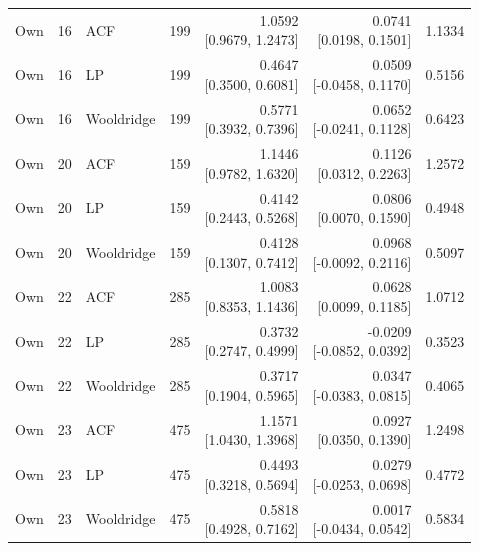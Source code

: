 \begin{longtable}{lllrrrr}
Own & 16 & ACF & 199 & \makecell{1.0592\\{[0.9679, 1.2473]}} & \makecell{0.0741\\{[0.0198, 0.1501]}} & 1.1334 \\
Own & 16 & LP & 199 & \makecell{0.4647\\{[0.3500, 0.6081]}} & \makecell{0.0509\\{[-0.0458, 0.1170]}} & 0.5156 \\
Own & 16 & Wooldridge & 199 & \makecell{0.5771\\{[0.3932, 0.7396]}} & \makecell{0.0652\\{[-0.0241, 0.1128]}} & 0.6423 \\
Own & 20 & ACF & 159 & \makecell{1.1446\\{[0.9782, 1.6320]}} & \makecell{0.1126\\{[0.0312, 0.2263]}} & 1.2572 \\
Own & 20 & LP & 159 & \makecell{0.4142\\{[0.2443, 0.5268]}} & \makecell{0.0806\\{[0.0070, 0.1590]}} & 0.4948 \\
Own & 20 & Wooldridge & 159 & \makecell{0.4128\\{[0.1307, 0.7412]}} & \makecell{0.0968\\{[-0.0092, 0.2116]}} & 0.5097 \\
Own & 22 & ACF & 285 & \makecell{1.0083\\{[0.8353, 1.1436]}} & \makecell{0.0628\\{[0.0099, 0.1185]}} & 1.0712 \\
Own & 22 & LP & 285 & \makecell{0.3732\\{[0.2747, 0.4999]}} & \makecell{-0.0209\\{[-0.0852, 0.0392]}} & 0.3523 \\
Own & 22 & Wooldridge & 285 & \makecell{0.3717\\{[0.1904, 0.5965]}} & \makecell{0.0347\\{[-0.0383, 0.0815]}} & 0.4065 \\
Own & 23 & ACF & 475 & \makecell{1.1571\\{[1.0430, 1.3968]}} & \makecell{0.0927\\{[0.0350, 0.1390]}} & 1.2498 \\
Own & 23 & LP & 475 & \makecell{0.4493\\{[0.3218, 0.5694]}} & \makecell{0.0279\\{[-0.0253, 0.0698]}} & 0.4772 \\
Own & 23 & Wooldridge & 475 & \makecell{0.5818\\{[0.4928, 0.7162]}} & \makecell{0.0017\\{[-0.0434, 0.0542]}} & 0.5834 \\

\end{longtable}
